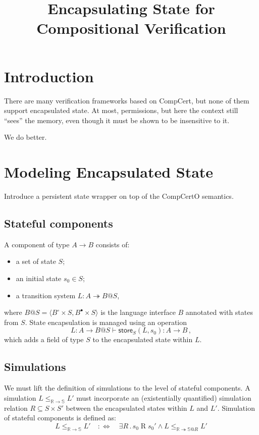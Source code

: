 \documentclass[acmsmall,screen,review,anonymous]{acmart}
\title{Encapsulating State for Compositional Verification}
\begin{document}
\maketitle

\section{Introduction}

There are many verification frameworks based on CompCert,
but none of them support encapsulated state.
At most, permissions,
but here the context still ``sees'' the memory,
even though it must be shown to be insensitive to it.

We do better.

\section{Modeling Encapsulated State}

Introduce a persistent state wrapper
on top of the CompCertO semantics.

\subsection{Stateful components}

A component of type $A \rightarrow B$
consists of:
\begin{itemize}
  \item a set of state $S$;
  \item an initial state $s_0 \in S$;
  \item a transition system $L : A \twoheadrightarrow B@S$,
\end{itemize}
where $B@S = \langle B^\circ \times S, B^\bullet \times S \rangle$
is the language interface $B$ annotated with states from $S$.
State encapsulation is managed using an operation
\[
  L : A \rightarrow B@S \vdash
  \mathsf{store}_S(L, s_0) : A \rightarrow B
  \,,
\]
which adds a field of type $S$ to the encapsulated state within $L$.

\subsection{Simulations}

We must lift the definition of simulations
to the level of stateful components.
A simulation $L \le_{\mathbb{R} \rightarrow \mathbb{S}} L'$
must incorporate an (existentially quantified)
simulation relation $R \subseteq S \times S'$
between the encapsulated states within $L$ and $L'$.
Simulation of stateful components is defined as:
\[
  L \le_{\mathbb{R} \rightarrow \mathbb{S}} L' \quad :\Leftrightarrow \quad
  \exists R \mathbin{.}
    s_0 \mathrel{R} s_0' \wedge
    L \le_{\mathbb{R} \twoheadrightarrow \mathbb{S}@R} L'
\]
\end{document}
